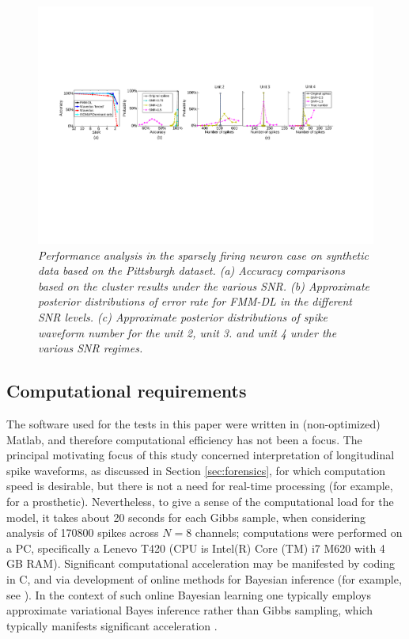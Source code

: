 \documentclass[journal]{IEEEtran}
\begin{document}
\begin{figure}[!htbp]
\centering
   \includegraphics[scale=0.70,angle=0] {figs_new/posterior_error_rate.pdf}
  \caption{\small \emph{Performance analysis in the sparsely firing neuron case on synthetic data based on the Pittsburgh dataset. (a) Accuracy comparisons based on the cluster results under the various SNR. (b) Approximate posterior distributions of error rate for FMM-DL in the different SNR levels. (c) Approximate posterior distributions of spike waveform number for the unit 2, unit 3. and unit 4 under the various SNR regimes. 
   }} \label{fig:posterior_error_rate}
\end{figure}



\subsection{Computational requirements}

The software used for the tests in this paper were written in (non-optimized) Matlab, and therefore computational efficiency has not been a focus. The principal motivating focus of this study concerned interpretation of {longitudinal} spike waveforms, as discussed in Section \ref{sec:forensics}, for which computation speed is desirable, but there is not a need for real-time processing (for example, for a prosthetic).
 Nevertheless, to give a sense of the computational load for the model, it takes about 20 seconds for each Gibbs sample, when considering analysis of 170800 spikes across $N=8$ channels; computations were performed on a PC, specifically a Lenevo T420 (CPU is Intel(R) Core (TM) i7 M620 with 4 GB RAM). Significant computational acceleration may be manifested by coding in C, and via development of online methods for Bayesian inference (for example, see \cite{Wang11}). In the context of such online Bayesian learning one typically employs approximate variational Bayes inference rather than Gibbs sampling, which typically manifests significant acceleration \cite{Wang11}.
\end{document}

